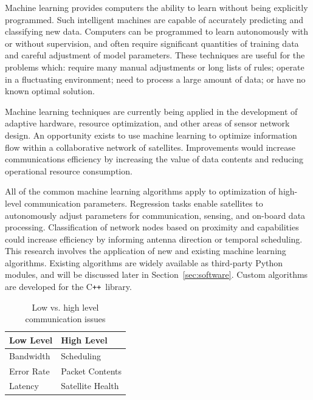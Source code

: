 \documentclass[conference]{IEEEtran}
\newcommand{\cpp}{C\texttt{++}~}
\begin{document}
Machine learning provides computers the ability to learn without being
explicitly programmed.  Such intelligent machines are capable of accurately
predicting and classifying new data.  Computers can be programmed to learn
autonomously with or without supervision, and often require significant
quantities of training data and careful adjustment of model parameters.  These
techniques are useful for the problems which: require many manual adjustments or
long lists of rules; operate in a fluctuating environment; need to process a
large amount of data; or have no known optimal solution.

Machine learning techniques are currently being applied in the development of
adaptive hardware, resource optimization, and other areas of sensor network
design.  An opportunity exists to use machine learning to optimize information
flow within a collaborative network of satellites.  Improvements would increase
communications efficiency by increasing the value of data contents and reducing
operational resource consumption.

All of the common machine learning algorithms apply to optimization of
high-level communication parameters.  Regression tasks enable satellites to
autonomously adjust parameters for communication, sensing, and on-board data
processing.  Classification of network nodes based on proximity and capabilities
could increase efficiency by informing antenna direction or temporal scheduling.
This research involves the application of new and existing machine learning
algorithms.  Existing algorithms are widely available as third-party Python
modules, and will be discussed later in Section~\ref{sec:software}.  Custom
algorithms are developed for the \cpp library.


\begin{table}[t]
  \caption{Low vs. high level communication issues}
  \begin{center}
    \begin{tabular}{|l|l|}
      \hline
      \textbf{Low Level} & \textbf{High Level}\\
      \hline
      Bandwidth & Scheduling\\
      \hline
      Error Rate & Packet Contents\\
      \hline
      Latency & Satellite Health\\
      \hline
    \end{tabular}
    \label{tab:comms}
  \end{center}
\end{table}
\end{document}
